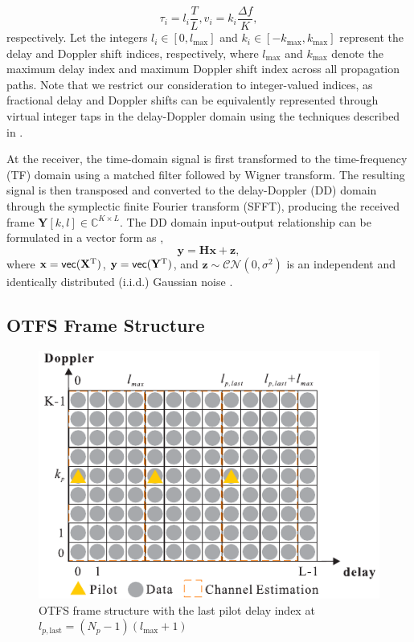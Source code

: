 \documentclass[journal]{IEEEtran}
\newcommand{\T}{^{\mathrm{T}}} %
\newcommand{\vect}{{\sf vec}} %
\begin{document}
\begin{equation}
{\tau}_i = l_i \frac{T}{L}, v_i = k_i \frac{\Delta f}{K},
\end{equation}
respectively. Let the integers $l_i \in [0, l_\max]$ and $k_i \in [-k_\max, k_\max]$ represent the delay and Doppler shift indices, respectively, where $l_\max$ and $k_\max$ denote the maximum delay index and maximum Doppler shift index across all propagation paths. Note that we restrict our consideration to integer-valued indices, as fractional delay and Doppler shifts can be equivalently represented through virtual integer taps in the delay-Doppler domain using the techniques described in \cite{6563167, 8377159, 8516353}.

At the receiver, the time-domain signal is first transformed to the time-frequency (TF) domain using a matched filter followed by Wigner transform. The resulting signal is then transposed and converted to the delay-Doppler (DD) domain through the symplectic finite Fourier transform (SFFT), producing the received frame $\mathbf{Y}[k,l] \in \mathbb{C}^{K \times L}$. The DD domain input-output relationship can be formulated in a vector form as \cite{10264119},
\begin{equation}
\mathbf y = \mathbf H\mathbf x + \mathbf z,
\label{eq:sys-DD}
\end{equation}
where $\mathbf x = \vect(\mathbf  X\T)$, $\mathbf  y = \vect(\mathbf  Y\T)$, and $\mathbf z \sim \mathcal{CN}(0, \sigma^2)$ is an independent and identically distributed (i.i.d.) Gaussian noise \cite{8516353, 10264119, 7925924}.


\subsection{OTFS Frame Structure}\label{sec:sys-frame}
\begin{figure}[htbp]
    \centering
    \includegraphics[scale=1]{otfs_frame}
    \caption{OTFS frame structure with the last pilot delay index at $l_{p,\text{last}} = (N_p - 1)(l_\max + 1)$}
    \label{fig:otfs_frame}
\end{figure}
\end{document}
